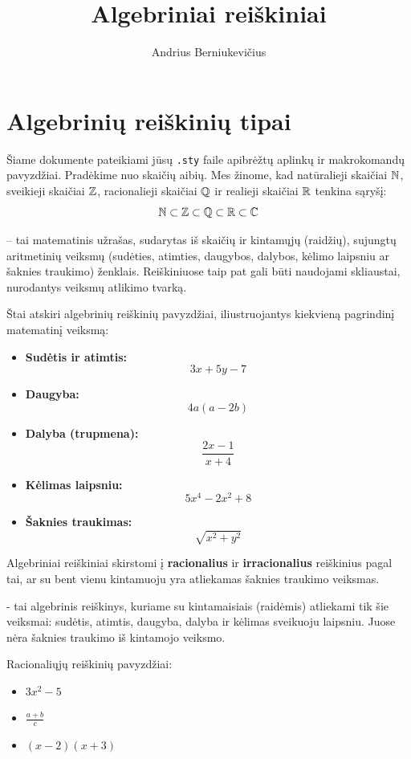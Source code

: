 \documentclass[11pt,a4paper]{scrartcl}
\title{Algebriniai reiškiniai}
\author{Andrius Berniukevičius}
\begin{document}
\maketitle


\section{Algebrinių reiškinių tipai}

Šiame dokumente pateikiami jūsų \texttt{.sty} faile apibrėžtų aplinkų ir makrokomandų pavyzdžiai. Pradėkime nuo skaičių aibių. Mes žinome, kad natūralieji skaičiai $\mathbb N$, sveikieji skaičiai $\mathbb Z$, racionalieji skaičiai $\mathbb Q$ ir realieji skaičiai $\mathbb R$ tenkina sąryšį:
\[ \mathbb N \subset \mathbb Z \subset \mathbb Q \subset \mathbb R \subset \mathbb C \]
\begin{definition}
     – tai matematinis užrašas, sudarytas iš skaičių ir kintamųjų (raidžių), sujungtų aritmetinių veiksmų (sudėties, atimties, daugybos, dalybos, kėlimo laipsniu ar šaknies traukimo) ženklais. Reiškiniuose taip pat gali būti naudojami skliaustai, nurodantys veiksmų atlikimo tvarką.
\end{definition}

\begin{example}
Štai atskiri algebrinių reiškinių pavyzdžiai, iliustruojantys kiekvieną pagrindinį matematinį veiksmą:
\begin{itemize}
    \item \textbf{Sudėtis ir atimtis:} 
    \[ 3x + 5y - 7 \]
    
    \item \textbf{Daugyba:} 
    \[ 4a(a - 2b) \]
    
    \item \textbf{Dalyba (trupmena):} 
    \[ \frac{2x - 1}{x + 4} \]
    
    \item \textbf{Kėlimas laipsniu:} 
    \[ 5x^4 - 2x^2 + 8 \]
    
    \item \textbf{Šaknies traukimas:} 
    \[ \sqrt{x^2 + y^2} \]
\end{itemize}
\end{example}

Algebriniai reiškiniai skirstomi į \textbf{racionalius} ir \textbf{irracionalius} reiškinius pagal tai, ar su bent vienu kintamuoju yra atliekamas šaknies traukimo veiksmas.
\begin{definition}
     - tai algebrinis reiškinys, kuriame su kintamaisiais (raidėmis) atliekami tik šie veiksmai: sudėtis, atimtis, daugyba, dalyba ir kėlimas sveikuoju laipsniu. Juose nėra šaknies traukimo iš kintamojo veiksmo.
\end{definition}
\begin{example}
Racionaliųjų reiškinių pavyzdžiai:
    \begin{itemize}
        \item $3x ^{2} -5$
        \item $\frac{a+b}{c} $
        \item $(x-2)(x+3)$ 
    \end{itemize}
\end{example}
\end{document}
